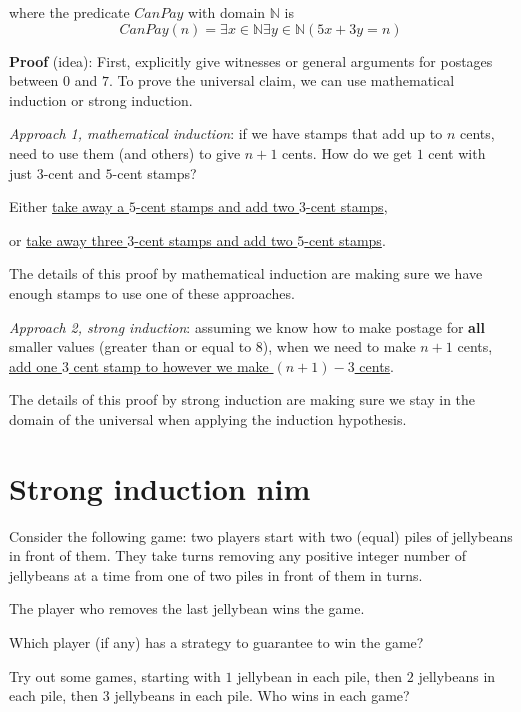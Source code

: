 \documentclass[12pt, oneside]{article}
\begin{document}
where the predicate $CanPay$ with domain $\mathbb{N}$ is
\[
    CanPay(n) = \exists x \in \mathbb{N} \exists y \in \mathbb{N}  ( 5x+3y = n)
\]


{\bf Proof} (idea): First, explicitly give witnesses or general arguments
for postages between $0$ and $7$. 
To prove the universal claim, we can use mathematical induction or strong induction.

{\it Approach 1, mathematical induction}: if we have
stamps that add up to $n$ cents, need to use them (and others)
to give $n+1$ cents. How do we get $1$ cent with just $3$-cent
and $5$-cent stamps?

\vspace{-10pt}
Either \underline{take away a $5$-cent stamps and add two $3$-cent stamps},

\vspace{-10pt}
or \underline{take away three $3$-cent stamps and add two $5$-cent stamps}.

\vspace{-10pt}
The details of this proof by mathematical induction
are making sure we have enough 
stamps to use one of these approaches.

{\it Approach 2, strong induction}: assuming we know how to make postage
for {\bf all} smaller values (greater than or equal to $8$), when
we need to make $n+1$ cents, \underline{add one $3$ cent stamp to 
however we make $(n+1) - 3$ cents}.

\vspace{-10pt}
The details of this proof by strong induction are making sure we 
stay in the domain of the universal when applying the induction hypothesis.
 \vfill
\section*{Strong induction nim}


Consider the following game: two players start with 
two (equal) piles of jellybeans in front of them.
They take turns removing any positive integer number
of jellybeans at a time from one of two piles in 
front of them in turns.

The player who removes the last jellybean wins the game.

Which player (if any) has a strategy to guarantee
to win the game?


Try out some games, starting with $1$ jellybean in each pile,
then $2$ jellybeans in each pile, then $3$ jellybeans in each pile.
Who wins in each game?
\end{document}

